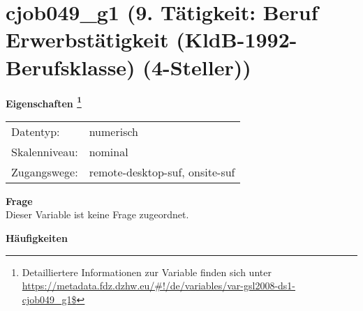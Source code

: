 
    \setcounter{footnote}{0}

    \vspace*{-1.8cm}
	\section{cjob049\_g1 (9. Tätigkeit: Beruf Erwerbstätigkeit (KldB-1992-Berufsklasse) (4-Steller))}
	\label{section:cjob049_g1}



    \vspace*{0.5cm}
    \noindent\textbf{Eigenschaften
	\footnote{Detailliertere Informationen zur Variable finden sich unter
		\url{https://metadata.fdz.dzhw.eu/\#!/de/variables/var-gsl2008-ds1-cjob049_g1$}}}\\
	\begin{tabularx}{\hsize}{@{}lX}
	Datentyp: & numerisch \\
	Skalenniveau: & nominal \\
	Zugangswege: &
	  remote-desktop-suf, 
	  onsite-suf
 \\
    \end{tabularx}



		\vspace*{0.5cm}
		\noindent\textbf{Frage}\\
		Dieser Variable ist keine Frage zugeordnet.





        		\vspace*{0.5cm}
                \noindent\textbf{Häufigkeiten}


